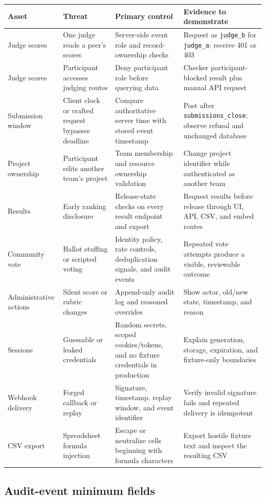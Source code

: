 \begin{longtable}{@{}L{31mm}L{38mm}L{43mm}L{46mm}@{}}
\toprule
\textbf{Asset} & \textbf{Threat} & \textbf{Primary control} & \textbf{Evidence to demonstrate}\\
\midrule
\endhead%
Judge scores & One judge reads a peer's scores & Server-side event role and record-ownership checks & Request as \texttt{judge\_b} for \texttt{judge\_a}; receive 401 or 403\\
Judge scores & Participant accesses judging routes & Deny participant role before querying data & Checker participant-blocked result plus manual API request\\
Submission window & Client clock or crafted request bypasses deadline & Compare authoritative server time with stored event timestamp & Post after \texttt{submissions\_close}; observe refusal and unchanged database\\
Project ownership & Participant edits another team's project & Team membership and resource ownership validation & Change project identifier while authenticated as another team\\
Results & Early ranking disclosure & Release-state checks on every result endpoint and export & Request results before release through UI, API, CSV, and embed routes\\
Community vote & Ballot stuffing or scripted voting & Identity policy, rate controls, deduplication signals, and audit events & Repeated vote attempts produce a visible, reviewable outcome\\
Administrative actions & Silent score or rubric changes & Append-only audit log and reasoned overrides & Show actor, old/new state, timestamp, and reason\\
Sessions & Guessable or leaked credentials & Random secrets, scoped cookies/tokens, and no fixture credentials in production & Explain generation, storage, expiration, and fixture-only boundaries\\
Webhook delivery & Forged callback or replay & Signature, timestamp, replay window, and event identifier & Verify invalid signature fails and repeated delivery is idempotent\\
CSV export & Spreadsheet formula injection & Escape or neutralize cells beginning with formula characters & Export hostile fixture text and inspect the resulting CSV\\
\bottomrule
\end{longtable}

\subsection{Audit-event minimum fields}

